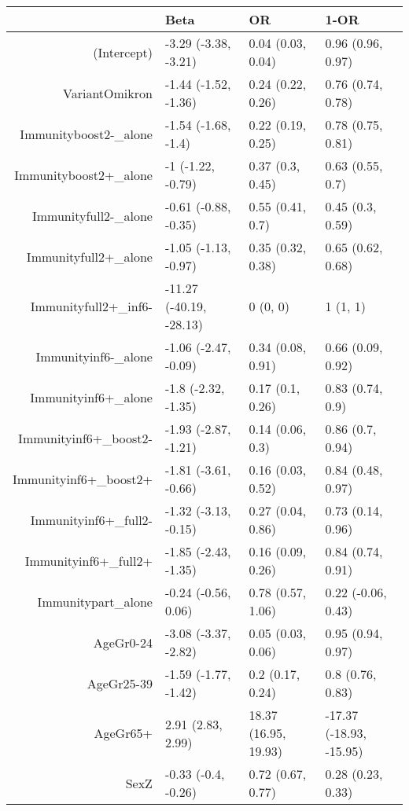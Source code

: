 \begin{table}[ht]
\centering
\begin{tabular}{rlll}
  \hline
 & Beta & OR & 1-OR \\ 
  \hline
(Intercept) & -3.29 (-3.38, -3.21) & 0.04 (0.03, 0.04) & 0.96 (0.96, 0.97) \\ 
  VariantOmikron & -1.44 (-1.52, -1.36) & 0.24 (0.22, 0.26) & 0.76 (0.74, 0.78) \\ 
  Immunityboost2-\_alone & -1.54 (-1.68, -1.4) & 0.22 (0.19, 0.25) & 0.78 (0.75, 0.81) \\ 
  Immunityboost2+\_alone & -1 (-1.22, -0.79) & 0.37 (0.3, 0.45) & 0.63 (0.55, 0.7) \\ 
  Immunityfull2-\_alone & -0.61 (-0.88, -0.35) & 0.55 (0.41, 0.7) & 0.45 (0.3, 0.59) \\ 
  Immunityfull2+\_alone & -1.05 (-1.13, -0.97) & 0.35 (0.32, 0.38) & 0.65 (0.62, 0.68) \\ 
  Immunityfull2+\_inf6- & -11.27 (-40.19, -28.13) & 0 (0, 0) & 1 (1, 1) \\ 
  Immunityinf6-\_alone & -1.06 (-2.47, -0.09) & 0.34 (0.08, 0.91) & 0.66 (0.09, 0.92) \\ 
  Immunityinf6+\_alone & -1.8 (-2.32, -1.35) & 0.17 (0.1, 0.26) & 0.83 (0.74, 0.9) \\ 
  Immunityinf6+\_boost2- & -1.93 (-2.87, -1.21) & 0.14 (0.06, 0.3) & 0.86 (0.7, 0.94) \\ 
  Immunityinf6+\_boost2+ & -1.81 (-3.61, -0.66) & 0.16 (0.03, 0.52) & 0.84 (0.48, 0.97) \\ 
  Immunityinf6+\_full2- & -1.32 (-3.13, -0.15) & 0.27 (0.04, 0.86) & 0.73 (0.14, 0.96) \\ 
  Immunityinf6+\_full2+ & -1.85 (-2.43, -1.35) & 0.16 (0.09, 0.26) & 0.84 (0.74, 0.91) \\ 
  Immunitypart\_alone & -0.24 (-0.56, 0.06) & 0.78 (0.57, 1.06) & 0.22 (-0.06, 0.43) \\ 
  AgeGr0-24 & -3.08 (-3.37, -2.82) & 0.05 (0.03, 0.06) & 0.95 (0.94, 0.97) \\ 
  AgeGr25-39 & -1.59 (-1.77, -1.42) & 0.2 (0.17, 0.24) & 0.8 (0.76, 0.83) \\ 
  AgeGr65+ & 2.91 (2.83, 2.99) & 18.37 (16.95, 19.93) & -17.37 (-18.93, -15.95) \\ 
  SexZ & -0.33 (-0.4, -0.26) & 0.72 (0.67, 0.77) & 0.28 (0.23, 0.33) \\ 
   \hline
\end{tabular}
\end{table}
